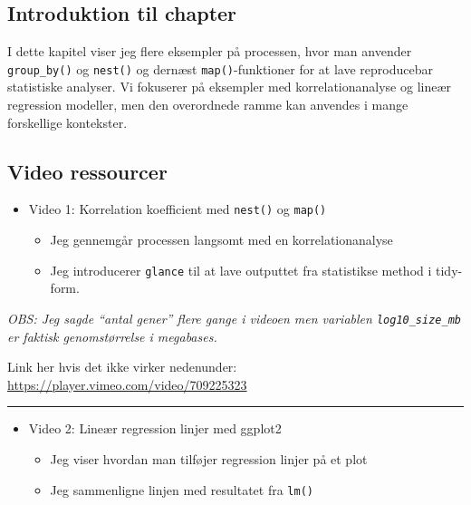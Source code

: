 \documentclass[
]{book}
\providecommand{\tightlist}{%
  \setlength{\itemsep}{0pt}\setlength{\parskip}{0pt}}
\begin{document}
\hypertarget{introduktion-til-chapter}{%
\subsection{Introduktion til chapter}\label{introduktion-til-chapter}}

I dette kapitel viser jeg flere eksempler på processen, hvor man anvender \texttt{group\_by()} og \texttt{nest()} og dernæst \texttt{map()}-funktioner for at lave reproducebar statistiske analyser. Vi fokuserer på eksempler med korrelationanalyse og lineær regression modeller, men den overordnede ramme kan anvendes i mange forskellige kontekster.

\hypertarget{video-ressourcer-4}{%
\subsection{Video ressourcer}\label{video-ressourcer-4}}

\begin{itemize}
\tightlist
\item
  Video 1: Korrelation koefficient med \texttt{nest()} og \texttt{map()}

  \begin{itemize}
  \tightlist
  \item
    Jeg gennemgår processen langsomt med en korrelationanalyse
  \item
    Jeg introducerer \texttt{glance} til at lave outputtet fra statistikse method i tidy-form.
  \end{itemize}
\end{itemize}

\emph{OBS: Jeg sagde ``antal gener'' flere gange i videoen men variablen \texttt{log10\_size\_mb} er faktisk genomstørrelse i megabases.}

Link her hvis det ikke virker nedenunder: \url{https://player.vimeo.com/video/709225323}

\begin{center}\rule{0.5\linewidth}{0.5pt}\end{center}

\begin{itemize}
\tightlist
\item
  Video 2: Lineær regression linjer med ggplot2

  \begin{itemize}
  \tightlist
  \item
    Jeg viser hvordan man tilføjer regression linjer på et plot
  \item
    Jeg sammenligne linjen med resultatet fra \texttt{lm()}
  \end{itemize}
\end{itemize}
\end{document}
